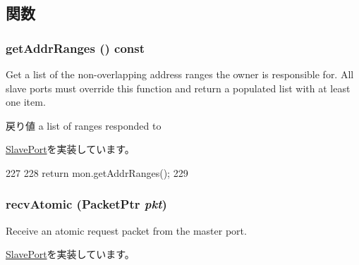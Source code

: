 \subsection{関数}
\hypertarget{classCommMonitor_1_1MonitorSlavePort_a36cf113d5e5e091ebddb32306c098fae}{
\subsubsection[{getAddrRanges}]{ getAddrRanges () const}}
\label{classCommMonitor_1_1MonitorSlavePort_a36cf113d5e5e091ebddb32306c098fae}
Get a list of the non-\/overlapping address ranges the owner is responsible for. All slave ports must override this function and return a populated list with at least one item.

\begin{DoxyReturn}{戻り値}
a list of ranges responded to 
\end{DoxyReturn}


\hyperlink{classSlavePort_a6e967f8921e80748eb2be35b6b481a7e}{SlavePort}を実装しています。


\begin{DoxyCode}
227         {
228             return mon.getAddrRanges();
229         }
\end{DoxyCode}
\hypertarget{classCommMonitor_1_1MonitorSlavePort_a5f0b4c4a94f6b0053f9d7a4eb9c2518a}{
\subsubsection[{recvAtomic}]{ recvAtomic ({\bf PacketPtr} {\em pkt})}}
\label{classCommMonitor_1_1MonitorSlavePort_a5f0b4c4a94f6b0053f9d7a4eb9c2518a}
Receive an atomic request packet from the master port. 

\hyperlink{classSlavePort_a428ab07671bc9372dc44a2487b12a726}{SlavePort}を実装しています。



